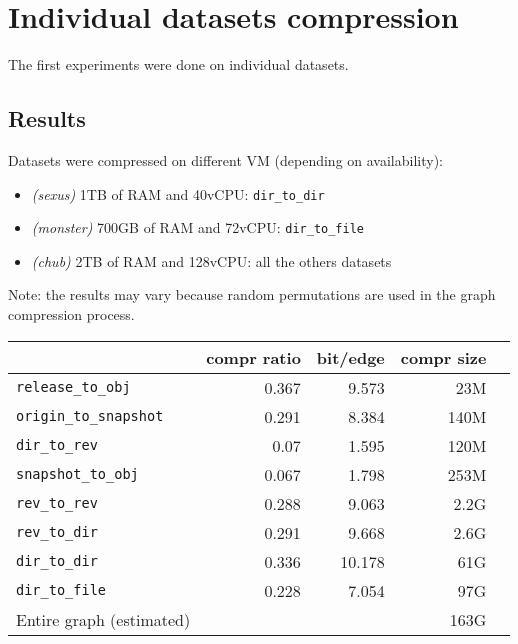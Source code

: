 \documentclass[11pt,a4paper]{article}
\begin{document}
\section{Individual datasets compression}

The first experiments were done on individual datasets.

\subsection{Results}

Datasets were compressed on different VM (depending on availability):

\begin{itemize}
    \item \textit{(sexus)} 1TB of RAM and 40vCPU: \texttt{dir_to_dir}
    \item \textit{(monster)} 700GB of RAM and 72vCPU:
        \texttt{dir_to_file}
    \item \textit{(chub)} 2TB of RAM and 128vCPU: all the others datasets
\end{itemize}

Note: the results may vary because random permutations are used in the graph
compression process.

\begin{center}
    \begin{tabular}{@{} l *4r @{}}
        \toprule
        \multicolumn{1}{c}{} &
            \textbf{compr ratio} & \textbf{bit/edge} & \textbf{compr
            size\footnotemark} \\
        \midrule
        \texttt{release\_to\_obj} & 0.367 & 9.573 & 23M \\
        \texttt{origin\_to\_snapshot} & 0.291 & 8.384 & 140M \\
        \texttt{dir\_to\_rev} & 0.07 & 1.595 & 120M & \\
        \texttt{snapshot\_to\_obj} & 0.067 & 1.798 & 253M \\
        \texttt{rev\_to\_rev} & 0.288 & 9.063 & 2.2G \\
        \texttt{rev\_to\_dir} & 0.291 & 9.668 & 2.6G \\
        \texttt{dir\_to\_dir} & 0.336 & 10.178 & 61G \\
        \texttt{dir\_to\_file} & 0.228 & 7.054 & 97G \\
        \midrule
        Entire graph (estimated) & & & 163G \\
        \bottomrule
    \end{tabular}
\end{center}
\end{document}
